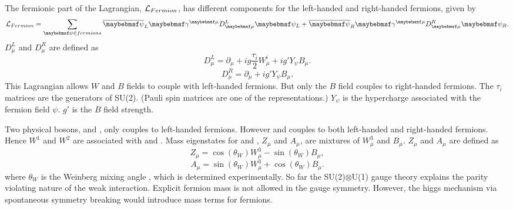 The fermionic part of the Lagrangian,   $\operatorname{\mathcal{L}}_{Fermion}$, has different components for the left-handed and right-handed fermions, given by
\begin{equation}
\Lagr_{Fermion} = \sum_{\psi\in{fermions}} {\overline{\psi}}_L \gamma^{\mu}D^L_{\mu} \psi_L +  \overline{\psi}_R \gamma^{\mu}D^R_{\mu} \psi_R .
\end{equation}
$D^L_{\mu}$ and $D^R_{\mu}$ are defined as
\begin{equation}
D^L_{\mu} = \partial_{\mu} + ig\frac{\tau_i}{2}W^i_{\mu} + ig'Y_{\psi}B_{\mu} .
\end{equation}
\begin{equation}
D^R_{\mu} = \partial_{\mu}  + ig'Y_{\psi}B_{\mu} .
\end{equation}
This Lagrangian allows $W$ and $B$ fields to couple with left-handed fermions. But only the $B$ field couples to right-handed fermions. The $\tau_i$ matrices are the generators of SU(2). (Pauli spin matrices are one of the representations.) $Y_{\psi}$ is the hypercharge associated with the fermion field $\psi$. $g'$ is the $B$ field strength.

Two physical bosons, \PWp and \PWm,  only couples to left-handed fermions. However \PZ and \Pgamma couples to both left-handed and right-handed fermions. Hence $W^1$ and $W^2$ are associated with \PWp and \PWm. Mass eigenstates for \PZ and \Pgamma, $Z_{\mu}$ and $A_{\mu}$, are mixtures of $W^3_{\mu}$ and $B_{\mu}$. $Z_{\mu}$ and $A_{\mu}$ are defined as
\begin{equation}
Z_{\mu} = \cos\left(\theta_W\right)W^3_{\mu} - \sin\left(\theta_W\right)B_{\mu},
\end{equation}
\begin{equation}
A_{\mu} = \sin\left(\theta_W\right)W^3_{\mu} + \cos\left(\theta_W\right)B_{\mu}.
\end{equation}
where $\theta_W$ is the Weinberg mixing angle \cite{Weinberg:1967tq}, which is determined experimentally. So far the SU(2)$\otimes$U(1) gauge theory explains the parity violating nature of the weak interaction. Explicit fermion mass is not allowed in the gauge symmetry. However, the higgs mechanism via spontaneous symmetry breaking would introduce mass terms for fermions.

